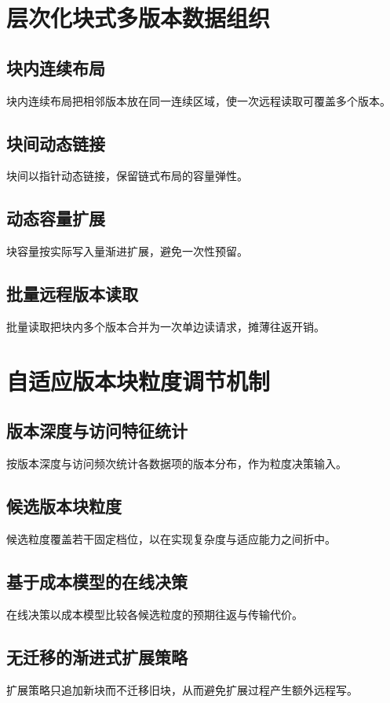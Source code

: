 \section{层次化块式多版本数据组织}
\subsection{块内连续布局}
块内连续布局把相邻版本放在同一连续区域，使一次远程读取可覆盖多个版本\cite{zhangMotor2024}。
\subsection{块间动态链接}
块间以指针动态链接，保留链式布局的容量弹性\cite{zhangMotor2024,tuSpeedy2013}。
\subsection{动态容量扩展}
块容量按实际写入量渐进扩展，避免一次性预留\cite{caiEfficient2018,zhangMotor2024}。
\subsection{批量远程版本读取}
批量读取把块内多个版本合并为一次单边读请求，摊薄往返开销\cite{caiEfficient2018,mitchellUsing2013}。

\section{自适应版本块粒度调节机制}
\subsection{版本深度与访问特征统计}
按版本深度与访问频次统计各数据项的版本分布，作为粒度决策输入\cite{zamanianChiller2020}。
\subsection{候选版本块粒度}
候选粒度覆盖若干固定档位，以在实现复杂度与适应能力之间折中\cite{binnigEnd2016}。
\subsection{基于成本模型的在线决策}
在线决策以成本模型比较各候选粒度的预期往返与传输代价\cite{zamanianChiller2020,binnigEnd2016}。
\subsection{无迁移的渐进式扩展策略}
扩展策略只追加新块而不迁移旧块，从而避免扩展过程产生额外远程写\cite{zhangMotor2024}。

